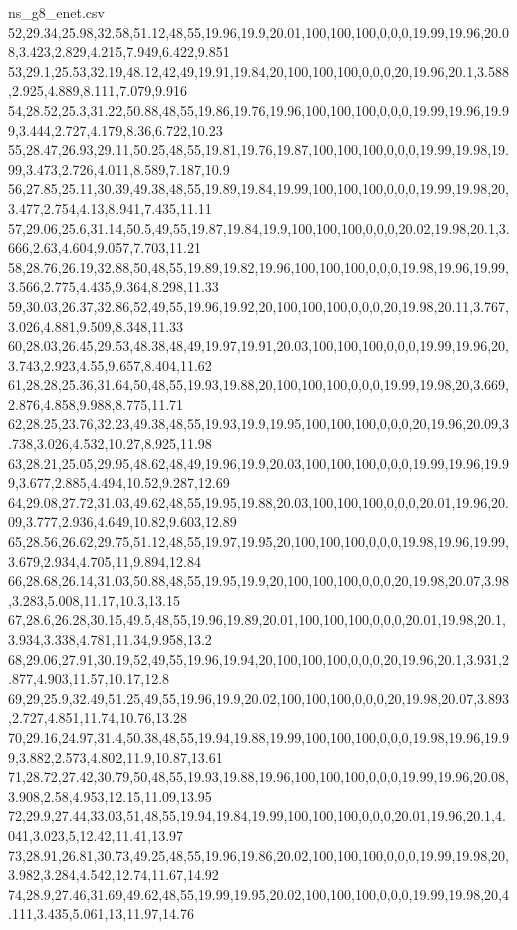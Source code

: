 \begin{filecontents*}[overwrite]{ns_g8_enet.csv}
52,29.34,25.98,32.58,51.12,48,55,19.96,19.9,20.01,100,100,100,0,0,0,19.99,19.96,20.08,3.423,2.829,4.215,7.949,6.422,9.851
53,29.1,25.53,32.19,48.12,42,49,19.91,19.84,20,100,100,100,0,0,0,20,19.96,20.1,3.588,2.925,4.889,8.111,7.079,9.916
54,28.52,25.3,31.22,50.88,48,55,19.86,19.76,19.96,100,100,100,0,0,0,19.99,19.96,19.99,3.444,2.727,4.179,8.36,6.722,10.23
55,28.47,26.93,29.11,50.25,48,55,19.81,19.76,19.87,100,100,100,0,0,0,19.99,19.98,19.99,3.473,2.726,4.011,8.589,7.187,10.9
56,27.85,25.11,30.39,49.38,48,55,19.89,19.84,19.99,100,100,100,0,0,0,19.99,19.98,20,3.477,2.754,4.13,8.941,7.435,11.11
57,29.06,25.6,31.14,50.5,49,55,19.87,19.84,19.9,100,100,100,0,0,0,20.02,19.98,20.1,3.666,2.63,4.604,9.057,7.703,11.21
58,28.76,26.19,32.88,50,48,55,19.89,19.82,19.96,100,100,100,0,0,0,19.98,19.96,19.99,3.566,2.775,4.435,9.364,8.298,11.33
59,30.03,26.37,32.86,52,49,55,19.96,19.92,20,100,100,100,0,0,0,20,19.98,20.11,3.767,3.026,4.881,9.509,8.348,11.33
60,28.03,26.45,29.53,48.38,48,49,19.97,19.91,20.03,100,100,100,0,0,0,19.99,19.96,20,3.743,2.923,4.55,9.657,8.404,11.62
61,28.28,25.36,31.64,50,48,55,19.93,19.88,20,100,100,100,0,0,0,19.99,19.98,20,3.669,2.876,4.858,9.988,8.775,11.71
62,28.25,23.76,32.23,49.38,48,55,19.93,19.9,19.95,100,100,100,0,0,0,20,19.96,20.09,3.738,3.026,4.532,10.27,8.925,11.98
63,28.21,25.05,29.95,48.62,48,49,19.96,19.9,20.03,100,100,100,0,0,0,19.99,19.96,19.99,3.677,2.885,4.494,10.52,9.287,12.69
64,29.08,27.72,31.03,49.62,48,55,19.95,19.88,20.03,100,100,100,0,0,0,20.01,19.96,20.09,3.777,2.936,4.649,10.82,9.603,12.89
65,28.56,26.62,29.75,51.12,48,55,19.97,19.95,20,100,100,100,0,0,0,19.98,19.96,19.99,3.679,2.934,4.705,11,9.894,12.84
66,28.68,26.14,31.03,50.88,48,55,19.95,19.9,20,100,100,100,0,0,0,20,19.98,20.07,3.98,3.283,5.008,11.17,10.3,13.15
67,28.6,26.28,30.15,49.5,48,55,19.96,19.89,20.01,100,100,100,0,0,0,20.01,19.98,20.1,3.934,3.338,4.781,11.34,9.958,13.2
68,29.06,27.91,30.19,52,49,55,19.96,19.94,20,100,100,100,0,0,0,20,19.96,20.1,3.931,2.877,4.903,11.57,10.17,12.8
69,29,25.9,32.49,51.25,49,55,19.96,19.9,20.02,100,100,100,0,0,0,20,19.98,20.07,3.893,2.727,4.851,11.74,10.76,13.28
70,29.16,24.97,31.4,50.38,48,55,19.94,19.88,19.99,100,100,100,0,0,0,19.98,19.96,19.99,3.882,2.573,4.802,11.9,10.87,13.61
71,28.72,27.42,30.79,50,48,55,19.93,19.88,19.96,100,100,100,0,0,0,19.99,19.96,20.08,3.908,2.58,4.953,12.15,11.09,13.95
72,29.9,27.44,33.03,51,48,55,19.94,19.84,19.99,100,100,100,0,0,0,20.01,19.96,20.1,4.041,3.023,5,12.42,11.41,13.97
73,28.91,26.81,30.73,49.25,48,55,19.96,19.86,20.02,100,100,100,0,0,0,19.99,19.98,20,3.982,3.284,4.542,12.74,11.67,14.92
74,28.9,27.46,31.69,49.62,48,55,19.99,19.95,20.02,100,100,100,0,0,0,19.99,19.98,20,4.111,3.435,5.061,13,11.97,14.76

\end{filecontents*}
